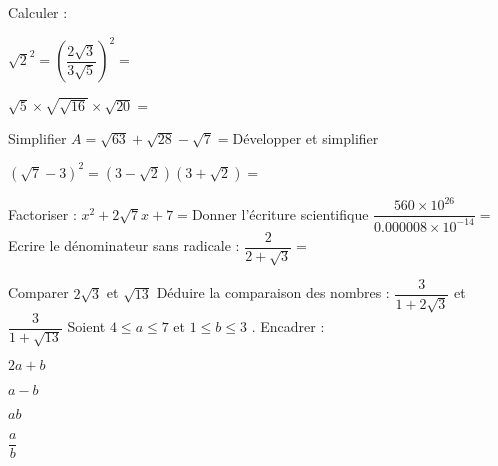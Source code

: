 \documentclass[a4paper,addpoints,12pt]{exam}
\begin{document}
\examen[prv=false,date= 2023]

\begin{exo}[7]
\begin{questions}
\question[2]Calculer :\droppoints
\begin{multicols}{2}
$\sqrt{2}^{2}=$\anserline[1]
$\left(\dfrac{2\sqrt{3}}{3\sqrt{5}}\right)^{2}=$\anserline[2]\columnbreak

$\sqrt{5}\times \sqrt{\sqrt{16}}\times\sqrt{20}=$\anserline[3]
\end{multicols}
\question[1]Simplifier \droppoints
$A=\sqrt{63}+\sqrt{28}-\sqrt{7}=$\anserline[3]
\question[1]Développer et simplifier\droppoints
\begin{multicols}{2}
$\left(\sqrt{7}-3\right)^{2}=$\anserline[2]
$\left(3-\sqrt{2}\right)\left(3+\sqrt{2}\right)=$\anserline[2]
\end{multicols}
\question[1]Factoriser :\droppoints
$x^{2}+2\sqrt{7}x+7=$\anserline[2]
\question[1]Donner l'écriture scientifique\droppoints
$\dfrac{560\times 10^{26}}{0.000008\times 10^{-14}}=$\anserline[3]
\question[1]Ecrire le dénominateur sans radicale :\droppoints
$\dfrac{2}{2+\sqrt{3}}=$\anserline[1]
\end{questions}
\end{exo}

\begin{exo}[4]
\begin{questions}
\question[1]Comparer $2\sqrt{3}$ et $\sqrt{13}$\droppoints
\anserline[2]
\question[1]Déduire la comparaison des nombres : 
$\dfrac{3}{1+2\sqrt{3}}$ et $\dfrac{3}{1+\sqrt{13}}$\droppoints
\anserline[4]
\question[2]Soient $4\leq a\leq 7$ et $1\leq b\leq 3$ . Encadrer :\droppoints
\begin{multicols}{4}
$2a+b$\columnbreak

$a-b$\columnbreak
 
$ab$\columnbreak
  
$\dfrac{a}{b}$ 
\end{multicols}
\end{questions}
\end{exo}
\end{document}
